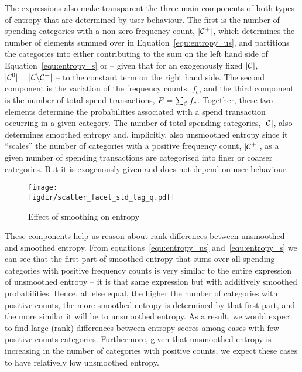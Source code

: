 The expressions also make transparent the three main components of both types
of entropy that are determined by user behaviour. The first is the number of
spending categories with a non-zero frequency count, $|\mathcal{C}^{+}|$, which
determines the number of elements summed over in Equation~\ref{equ:entropy_us},
and partitions the categories into either contributing to the sum on the left
hand side of Equation~\ref{equ:entropy_s} or -- given that for an exogenously
fixed $|\mathcal{C}|$, $|\mathcal{C}^{0}| = |\mathcal{C} \backslash \mathcal{C}^{+}|$ -- to the constant term
on the right hand side. The second component is the variation of the frequency
counts, $f_c$, and the third component is the number of total spend
transactions, $F = \sum_{\mathcal{C}}f_c$. Together, these two elements determine the probabilities
associated with a spend transaction occurring in a given category. The number
of total spending categories, $|\mathcal{C}|$, also determines smoothed entropy and,
implicitly, also unsmoothed entropy since it ``scales'' the number of
categories with a positive frequency count, $|\mathcal{C}^{+}|$, as a given number of
spending transactions are categorised into finer or coarser categories. But it
is exogenously given and does not depend on user behaviour.

\begin{figure}[ht]
    \centering 
    \caption{Effect of smoothing on entropy}
    \label{fig:scatter_facets}
    \texttt{[image: \\figdir/scatter\_facet\_std\_tag\_q.pdf]}
\end{figure}

These components help us reason about rank differences between unsmoothed and
smoothed entropy. From equations~\ref{equ:entropy_us} and~\ref{equ:entropy_s}
we can see that the first part of smoothed entropy that sums over all spending
categories with positive frequency counts is very similar to the entire
expression of unsmoothed entropy -- it is that same expression but with
additively smoothed probabilities. Hence, all else equal, the higher the number
of categories with positive counts, the more smoothed entropy is determined by
that first part, and the more similar it will be to unsmoothed entropy. As a
result, we would expect to find large (rank) differences between entropy scores
among cases with few positive-counts categories. Furthermore, given that
unsmoothed entropy is increasing in the number of categories with positive
counts, we expect these cases to have relatively low unsmoothed entropy.

